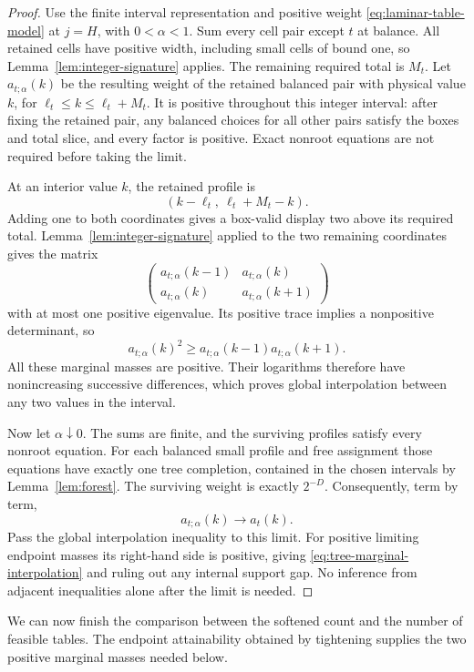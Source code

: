 \begin{proof}
Use the finite interval representation and positive weight
\eqref{eq:laminar-table-model} at $j=H$, with $0<\alpha<1$.
Sum every cell pair except $t$ at balance.  All retained cells have
positive width, including small cells of bound one, so
Lemma~\ref{lem:integer-signature} applies.  The remaining required
total is $M_t$.
Let $a_{t;\alpha}(k)$ be the resulting weight of the retained balanced
pair with physical value $k$, for
$\ell_t\le k\le\ell_t+M_t$.
It is positive throughout this integer interval: after fixing the
retained pair, any balanced choices for all other pairs satisfy the
boxes and total slice, and every factor is positive.  Exact nonroot
equations are not required before taking the limit.

At an interior value \(k\), the retained profile is
\[
 (k-\ell_t,\ \ell_t+M_t-k).
\]
Adding one to both coordinates gives a box-valid display two above
its required total.
Lemma~\ref{lem:integer-signature} applied to the two remaining
coordinates gives the matrix
\[
 \begin{pmatrix}
  a_{t;\alpha}(k-1)&a_{t;\alpha}(k)\\
  a_{t;\alpha}(k)&a_{t;\alpha}(k+1)
 \end{pmatrix}
\]
with at most one positive eigenvalue.
Its positive trace implies a nonpositive determinant, so
\[
 a_{t;\alpha}(k)^2
 \ge a_{t;\alpha}(k-1)a_{t;\alpha}(k+1).
\]
All these marginal masses are positive.
Their logarithms therefore have nonincreasing successive
differences, which proves global interpolation between any two
values in the interval.

Now let $\alpha\downarrow0$.  The sums are finite, and the surviving
profiles satisfy every nonroot equation.  For each balanced small
profile and free assignment those equations have exactly one tree
completion, contained in the chosen intervals by
Lemma~\ref{lem:forest}.  The surviving weight is exactly $2^{-D}$.
Consequently, term by term,
\[
 a_{t;\alpha}(k)\longrightarrow a_t(k).
\]
Pass the global interpolation inequality to this limit.
For positive limiting endpoint masses its right-hand side is
positive, giving \eqref{eq:tree-marginal-interpolation} and ruling
out any internal support gap.
No inference from adjacent inequalities alone after the limit is
needed.
\end{proof}

We can now finish the comparison between the softened count and the
number of feasible tables.  The endpoint attainability obtained by
tightening supplies the two positive marginal masses needed below.

